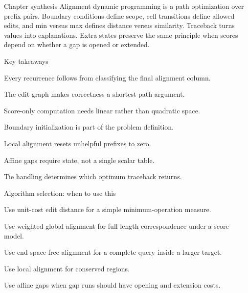 \documentclass[11pt,letterpaper]{article}
\begin{document}
\begin{CornellSummaryBox}{Chapter synthesis}
Alignment dynamic programming is a path optimization over prefix pairs. Boundary conditions define scope, cell transitions define allowed edits, and min versus max defines distance versus similarity. Traceback turns values into explanations. Extra states preserve the same principle when scores depend on whether a gap is opened or extended.
\end{CornellSummaryBox}

\begin{CornellSummaryBox}{Key takeaways}
\begin{CornellRecallList}
  \item Every recurrence follows from classifying the final alignment column.
  \item The edit graph makes correctness a shortest-path argument.
  \item Score-only computation needs linear rather than quadratic space.
  \item Boundary initialization is part of the problem definition.
  \item Local alignment resets unhelpful prefixes to zero.
  \item Affine gaps require state, not a single scalar table.
  \item Tie handling determines which optimum traceback returns.
\end{CornellRecallList}
\end{CornellSummaryBox}

\begin{CornellOverviewBox}{Algorithm selection: when to use this}
\begin{CornellChecklist}
  \item Use unit-cost edit distance for a simple minimum-operation measure.
  \item Use weighted global alignment for full-length correspondence under a score model.
  \item Use end-space-free alignment for a complete query inside a larger target.
  \item Use local alignment for conserved regions.
  \item Use affine gaps when gap runs should have opening and extension costs.
\end{CornellChecklist}
\end{CornellOverviewBox}
\end{document}
